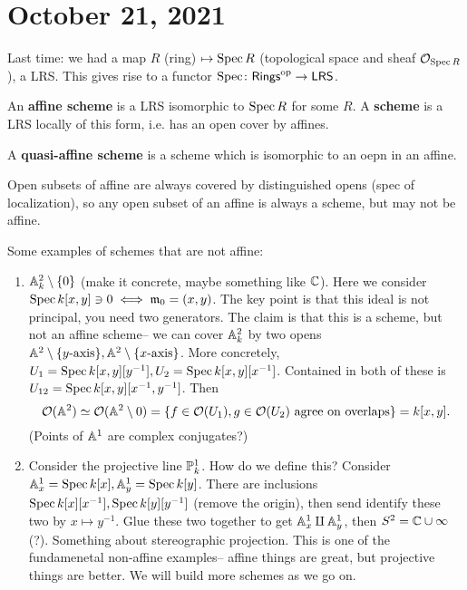 \section{October 21, 2021} 
Last time: we had a map $R$ (ring) $\mapsto  \Spec R$ (topological space and sheaf $\mathcal{O} _{\Spec R}$), a LRS. This gives rise to a functor $\Spec \colon \mathsf{Rings}^{\mathrm{op}}  \to \mathsf{LRS} $.

\begin{definition}[]
    An \textbf{affine scheme} is a LRS isomorphic to $\Spec R$ for some $R$. A \textbf{scheme} is a LRS locally of this form, i.e. has an open cover by affines.
\end{definition}
\begin{definition}[]
    A \textbf{quasi-affine scheme} is a scheme which is isomorphic to an oepn in an affine.
\end{definition}
Open subsets of affine are always covered by distinguished opens (spec of localization), so any open subset of an affine is always a scheme, but may not be affine.
\begin{example}
    Some examples of schemes that are not affine:
    \begin{enumerate}[label=(\arabic*)]
    \setlength\itemsep{-.2em}
\item  $\A ^2_k \setminus \{0\} $ (make it concrete, maybe something like $\C$). Here we consider $\Spec k[x,y] \ni 0 \iff \mathfrak m_0 = (x,y)$. The key point is that this ideal is not principal, you need two generators. The claim is that this is a scheme, but not an affine scheme-- we can cover $\A^2_k$ by two opens $\A^2 \setminus \{y\text{-axis} \} , \A^2 \setminus \{x\text{-axis} \} $. More concretely, $U_1= \Spec k[x,y][y^{-1}],U_2=\Spec k[x,y][x ^{-1}]$. Contained in both of these is $U_{12}=\Spec k[x,y][x ^{-1} , y ^{-1}]$. Then 
        \[
            \mathcal{O} (\A^2) \simeq  \mathcal{O} (\A^2 \setminus 0) =\{  f \in \mathcal{O} (U_1), g \in \mathcal{O} (U_2) \ \text{agree on overlaps} \}= k[x,y].
        \] (Points of $\A^1$ are complex conjugates?)
    \item Consider the projective line $\P^1_k$. How do we define this? Consider  $\A^1_x=\Spec k[x],\A^1_y = \Spec k[y]$. There are inclusions $\Spec k[x][x^{-1}],\Spec k[y][y^{-1}]$ (remove the origin), then send identify these two by $x \mapsto  y ^{-1}$. Glue these two together to get $\A^1_x \amalg \A_y^1$, then  $S ^2= \C \cup \infty$ (?). Something about stereographic projection. This is one of the fundamenetal non-affine examples-- affine things are great, but projective things are better. We will build more schemes as we go on.
    \end{enumerate}
\end{example}

